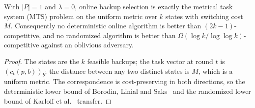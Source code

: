 \begin{proposition}
With $|P| = 1$ and $\lambda = 0$, online backup selection is exactly the metrical
task system (MTS) problem on the uniform metric over $k$ states with switching cost
$M$. Consequently no deterministic online algorithm is better than
$(2k-1)$-competitive, and no randomized algorithm is better than
$\Omega(\log k / \log\log k)$-competitive against an oblivious adversary.
\end{proposition}

\begin{proof}
The states are the $k$ feasible backups; the task vector at round $t$ is
$(c_t(p,b))_{b}$; the distance between any two distinct states is $M$, which is a
uniform metric. The correspondence is cost-preserving in both directions, so the
deterministic lower bound of Borodin, Linial and Saks~\cite{borodin1992mts} and the
randomized lower bound of Karloff et al.~\cite{karloff1994mts} transfer.
\end{proof}
